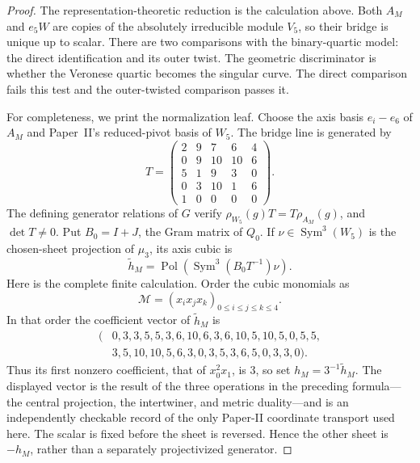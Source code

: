 \documentclass[11pt]{article}
\theoremstyle{definition}
\theoremstyle{remark}
\newcommand{\Sym}{\operatorname{Sym}}
\begin{document}
\begin{proof}
The representation-theoretic reduction is the calculation above.  Both
\(A_M\) and \(e_5W\) are copies of the absolutely irreducible module \(V_5\),
so their bridge is unique up to scalar.  There are two comparisons with the
binary-quartic model: the direct identification and its outer twist.  The
geometric discriminator is whether the Veronese quartic becomes the singular
curve.  The direct comparison fails this test and the outer-twisted
comparison passes it.

For completeness, we print the normalization leaf.  Choose the axis basis
\(e_i-e_6\) of \(A_M\) and Paper~II's reduced-pivot basis of \(W_5\).  The
bridge line is generated by
\[
 T=\begin{pmatrix}
 2&9&7&6&4\\
 0&9&10&10&6\\
 5&1&9&3&0\\
 0&3&10&1&6\\
 1&0&0&0&0
 \end{pmatrix}.
\]
The defining generator relations of \(G\) verify
\(\rho_{W_5}(g)T=T\rho_{A_M}(g)\), and \(\det T\ne0\).  Put \(B_0=I+J\),
the Gram matrix of \(Q_0\).  If \(\nu\in\Sym^3(W_5)\) is the chosen-sheet
projection of \(\mu_3\), its axis cubic is
\[
 \widetilde h_M=
 \operatorname{Pol}\!\left(\Sym^3(B_0T^{-1})\nu\right).
\]
Here is the complete finite calculation.  Order the cubic monomials as
\[
             \mathcal M=(x_ix_jx_k)_{0\leq i\leq j\leq k\leq4}.
\]
In that order the coefficient vector of \(\widetilde h_M\) is
\[
\begin{split}
(&0,3,3,5,5,3,6,10,6,3,6,10,5,10,5,0,5,5,\\
 &3,5,10,10,5,6,3,0,3,5,3,6,5,0,3,3,0).
\end{split}
\]
Thus its first nonzero coefficient, that of \(x_0^2x_1\), is \(3\), so set
\(h_M=3^{-1}\widetilde h_M\).  The displayed vector is the result of the
three operations in the preceding formula---the central projection, the
intertwiner, and metric duality---and is an independently checkable record
of the only Paper-II coordinate transport used here.  The scalar is fixed
before the sheet is
reversed.  Hence the other sheet is \(-h_M\), rather than a separately
projectivized generator.


\end{proof}
\end{document}

